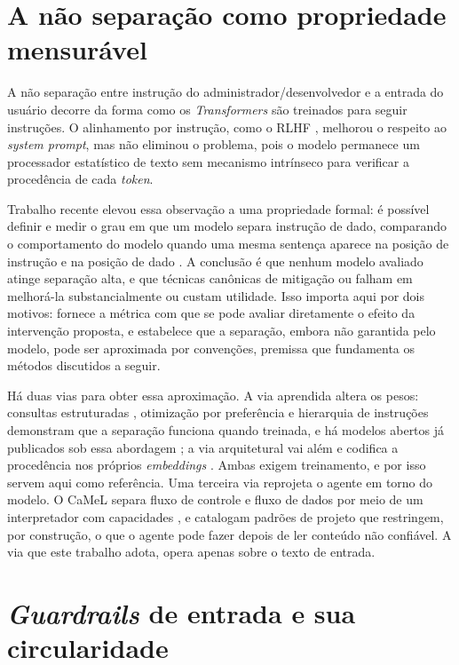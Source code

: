 \section{A não separação como propriedade mensurável}\label{sec:nao_separacao}

A não separação entre instrução do administrador/desenvolvedor e a entrada do usuário decorre da forma como os
\textit{Transformers} são treinados para seguir instruções. O alinhamento por
instrução, como o RLHF \cite{ouyang2022instructgpt}, melhorou o respeito ao
\textit{system prompt}, mas não eliminou o problema, pois o modelo permanece um
processador estatístico de texto sem mecanismo intrínseco para verificar a
procedência de cada \textit{token}.

Trabalho recente elevou essa observação a uma propriedade formal: é possível
definir e medir o grau em que um modelo separa instrução de dado,
comparando o comportamento do modelo quando uma mesma sentença aparece na
posição de instrução e na posição de dado \cite{zverev2025separation}. A
conclusão é que nenhum modelo avaliado atinge separação alta, e que técnicas
canônicas de mitigação ou falham em melhorá-la substancialmente ou custam
utilidade. Isso importa aqui por dois motivos: fornece a métrica com que se pode
avaliar diretamente o efeito da intervenção proposta, e estabelece que a
separação, embora não garantida pelo modelo, pode ser
aproximada por convenções, premissa que fundamenta os métodos
discutidos a seguir.

Há duas vias para obter essa aproximação. A via aprendida altera os
pesos: consultas estruturadas \cite{chen2025struq}, otimização por preferência
\cite{chen2025secalign} e hierarquia de instruções \cite{wallace2024hierarchy}
demonstram que a separação funciona quando treinada, e há modelos abertos já
publicados sob essa abordagem \cite{chen2025metasecalign}; a via arquitetural vai
além e codifica a procedência nos próprios \textit{embeddings}
\cite{zverev2026aside}. Ambas exigem treinamento, e por isso servem aqui como
referência. Uma terceira via reprojeta o agente em
torno do modelo. O CaMeL separa fluxo de controle e fluxo
de dados por meio de um interpretador com capacidades
\cite{debenedetti2025camel}, e 
catalogam padrões de projeto que restringem, por construção, o que o agente
pode fazer depois de ler conteúdo não confiável. A via
que este trabalho adota, opera apenas sobre o texto de entrada.

\section{\textit{Guardrails} de entrada e sua circularidade}\label{sec:guardrails}

